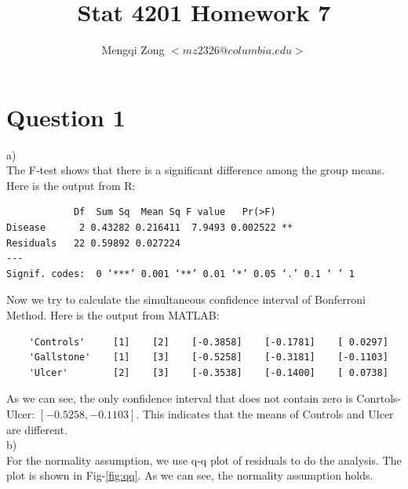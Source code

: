 \documentclass[12pt]{article}
\title{Stat 4201 Homework 7}
\author{Mengqi Zong $<mz2326@columbia.edu>$}
\begin{document}
\maketitle

\setlength{\parindent}{0in}

\section*{Question 1}

a) \\

The F-test shows that there is a significant difference among the
group means. Here is the output from R:

\begin{verbatim}
            Df  Sum Sq  Mean Sq F value   Pr(>F)   
Disease      2 0.43282 0.216411  7.9493 0.002522 **
Residuals   22 0.59892 0.027224                    
---
Signif. codes:  0 ‘***’ 0.001 ‘**’ 0.01 ‘*’ 0.05 ‘.’ 0.1 ‘ ’ 1 
\end{verbatim}

Now we try to calculate the  simultaneous confidence interval of
Bonferroni Method. Here is the output from MATLAB:

\begin{verbatim}
    'Controls'     [1]    [2]    [-0.3858]    [-0.1781]    [ 0.0297]
    'Gallstone'    [1]    [3]    [-0.5258]    [-0.3181]    [-0.1103]
    'Ulcer'        [2]    [3]    [-0.3538]    [-0.1400]    [ 0.0738]
\end{verbatim}

As we can see, the only confidence interval that does not contain zero
is Conrtols-Ulcer: $[-0.5258, -0.1103]$. This indicates that the means
of Controls and Ulcer are different. \\

b) \\

For the normality assumption, we use q-q plot of residuals to do
the analysis. The plot is shown in Fig-\ref{fig:qq}. As we can see,
the normality assumption holds.
\end{document}
